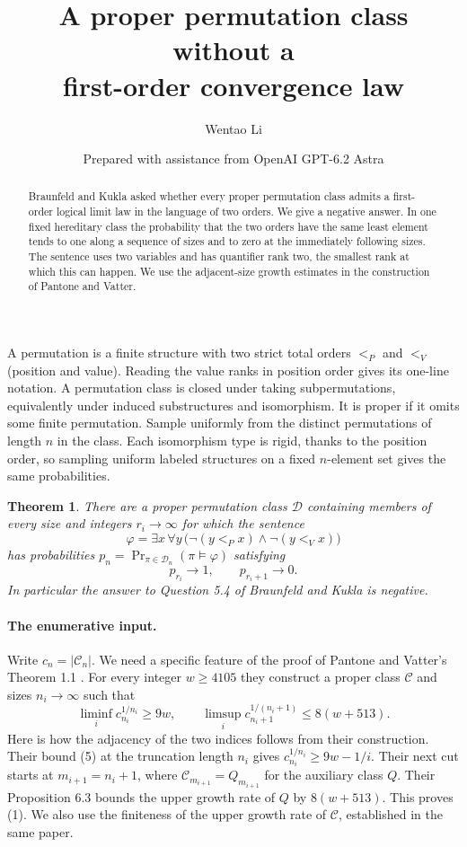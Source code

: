 \documentclass[11pt]{article}
\title{A proper permutation class without a\\first-order convergence law}
\author{Wentao Li}
\date{Prepared with assistance from OpenAI GPT-6.2 Astra}
\newtheorem{theorem}{Theorem}
\newcommand{\C}{\mathcal C}
\newcommand{\D}{\mathcal D}
\begin{document}
\maketitle
\begin{abstract}
Braunfeld and Kukla asked whether every proper permutation class admits a first-order logical limit law in the language of two orders. We give a negative answer. In one fixed hereditary class the probability that the two orders have the same least element tends to one along a sequence of sizes and to zero at the immediately following sizes. The sentence uses two variables and has quantifier rank two, the smallest rank at which this can happen. We use the adjacent-size growth estimates in the construction of Pantone and Vatter.
\end{abstract}

A permutation is a finite structure with two strict total orders $<_P$ and $<_V$ (position and value). Reading the value ranks in position order gives its one-line notation. A permutation class is closed under taking subpermutations, equivalently under induced substructures and isomorphism. It is proper if it omits some finite permutation. Sample uniformly from the distinct permutations of length $n$ in the class. Each isomorphism type is rigid, thanks to the position order, so sampling uniform labeled structures on a fixed $n$-element set gives the same probabilities.

\begin{theorem}
There are a proper permutation class $\D$ containing members of every size and integers $r_i\to\infty$ for which the sentence
\[
 \varphi=\exists x\,\forall y\,\bigl(\neg(y<_P x)\land\neg(y<_V x)\bigr)
\]
has probabilities $p_n=\Pr_{\pi\in\D_n}(\pi\models\varphi)$ satisfying
\[
                 p_{r_i}\longrightarrow1,\qquad
                 p_{r_i+1}\longrightarrow0 .
\]
In particular the answer to Question 5.4 of Braunfeld and Kukla \cite{bk} is negative.
\end{theorem}

\paragraph{The enumerative input.}
Write $c_n=|\C_n|$. We need a specific feature of the proof of Pantone and Vatter's Theorem 1.1 \cite[\S6.3]{pv}. For every integer $w\ge4105$ they construct a proper class $\C$ and sizes $n_i\to\infty$ such that
\begin{equation}
 \liminf_i c_{n_i}^{1/n_i}\ge 9w,\qquad
 \limsup_i c_{n_i+1}^{1/(n_i+1)}\le 8(w+513).                  \tag{1}
\end{equation}
Here is how the adjacency of the two indices follows from their construction. Their bound (5) at the truncation length $n_i$ gives $c_{n_i}^{1/n_i}\ge9w-1/i$. Their next cut starts at $m_{i+1}=n_i+1$, where $\C_{m_{i+1}}=Q_{m_{i+1}}$ for the auxiliary class $Q$. Their Proposition 6.3 bounds the upper growth rate of $Q$ by $8(w+513)$. This proves (1). We also use the finiteness of the upper growth rate of $\C$, established in the same paper.
\end{document}
